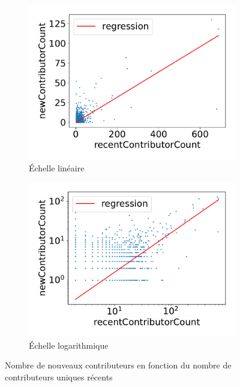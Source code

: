 \documentclass[dvipsnames,runningheads]{llncs}
\begin{document}
    \begin{figure}
        \centering
        \begin{subfigure}[t]{0.5\textwidth}
            \includegraphics[width=\textwidth]{../experiment/data_analysis/recentContributorCountRegression_linearScale}
            \caption{Échelle linéaire}
        \end{subfigure}%
        \begin{subfigure}[t]{0.5\textwidth}
            \includegraphics[width=\textwidth]{../experiment/data_analysis/recentContributorCountRegression_logScale}
            \caption{Échelle logarithmique}
        \end{subfigure}

        \caption{Nombre de nouveaux contributeurs en fonction du nombre de contributeurs uniques récents}
        \label{fig:contributorCount}
    \end{figure}
\end{document}

